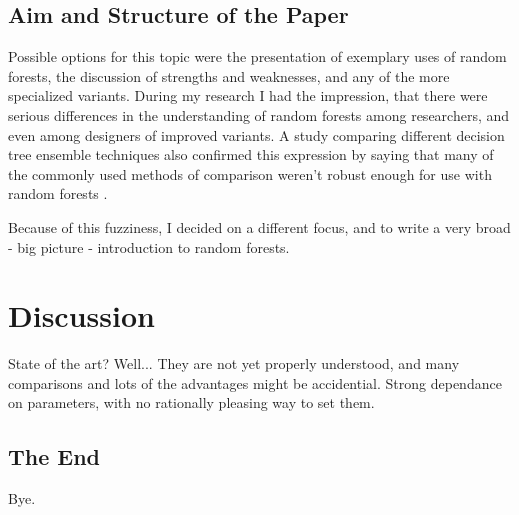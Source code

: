 \documentclass[a4paper,man,12pt,apacite,floatsintext,draftfirst]{apa6} %
\begin{document}
\subsection{Aim and Structure of the Paper}
Possible options for this topic were the presentation of
exemplary uses of random
forests, the discussion of strengths and weaknesses, and any of the more
specialized variants.
During my research I had the impression, that there were serious
differences in the understanding of random forests among researchers,
and even among designers of improved variants.
A study comparing different decision tree ensemble techniques also confirmed
this expression by saying that many of the commonly used methods of comparison
weren't robust enough for use with random forests \cite{banfield2007comparison}.

Because of this fuzziness, I decided on a different focus, and to write
a very broad - big picture - introduction to random forests.

\newpage
\section{Discussion}
State of the art? Well... They are not yet properly understood, and
many comparisons and lots of the advantages might be accidential.
Strong dependance on parameters, with no rationally pleasing way to set them.

\subsection{The End}
Bye.


\end{document}
